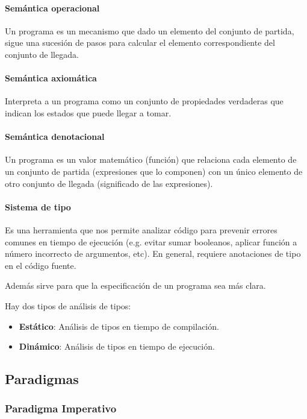 \paragraph{Semántica operacional} Un programa es un mecanismo que dado un elemento del conjunto de partida, sigue una sucesión de pasos para calcular el elemento correspondiente del conjunto de llegada.

\paragraph{Semántica axiomática} Interpreta a un programa como un conjunto de propiedades verdaderas que indican los estados que puede llegar a tomar.

\paragraph{Semántica denotacional} Un programa es un valor matemático (función) que relaciona cada elemento de un conjunto de partida (expresiones que lo componen) con un único elemento de otro conjunto de llegada (significado de las expresiones).

\paragraph{Sistema de tipo} Es una herramienta que nos permite analizar código para prevenir errores comunes en tiempo de ejecución (e.g. evitar sumar booleanos, aplicar función a número incorrecto de argumentos, etc). En general, requiere anotaciones de tipo en el código fuente. 

Además sirve para que la especificación de un programa sea más clara.

Hay dos tipos de análisis de tipos:
\begin{itemize}
	\item \textbf{Estático}: Análisis de tipos en tiempo de compilación.
	\item \textbf{Dinámico}: Análisis de tipos en tiempo de ejecución.
\end{itemize}

\subsection{Paradigmas}
\subsubsection{Paradigma Imperativo}

